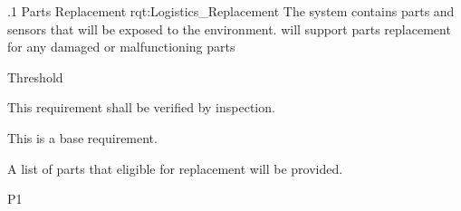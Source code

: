 \ONERQMTV
{\RqtNumberBase.1}
{Parts Replacement}
{rqt:Logistics_Replacement}
{The system contains parts and sensors that will be exposed to the environment. \ThisSystem will support parts replacement for any damaged or malfunctioning parts}
{
	\item [All Phases] Threshold
}
{This requirement shall be verified by inspection.}
{
	\item [N/A] This is a base requirement.
}
{
	\item A list of parts that eligible for replacement will be provided.
}
{P1}

